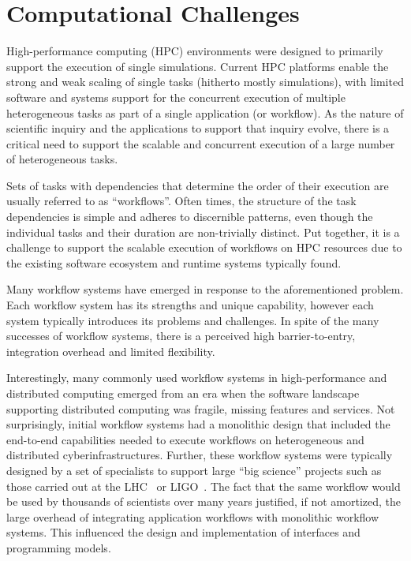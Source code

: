 \documentclass[conference]{IEEEtran}
\begin{document}
\section{Computational Challenges}\label{sec:cc}

High-performance computing (HPC) environments were designed to primarily
support the execution of single simulations. Current HPC platforms enable the
strong and weak scaling of single tasks (hitherto mostly simulations), with
limited software and systems support for the concurrent execution of multiple
heterogeneous tasks as part of a single application (or workflow). As the
nature of scientific inquiry and the applications to support that inquiry
evolve, there is a critical need to support the scalable and concurrent
execution of a large number of heterogeneous tasks.

Sets of tasks with dependencies that determine the order of their execution
are usually referred to as ``workflows''. Often times, the structure of the
task dependencies is simple and adheres to discernible patterns, even though
the individual tasks and their duration are non-trivially distinct. Put
together, it is a challenge to support the scalable execution of workflows on
HPC resources due to the existing software ecosystem and runtime systems
typically found.

Many workflow systems have emerged in response to the aforementioned problem.
Each workflow system has its strengths and unique capability, however each
system typically introduces its problems and challenges. In spite of the many
successes of workflow systems, there is a perceived high barrier-to-entry,
integration overhead and limited flexibility.

Interestingly, many commonly used workflow systems in high-performance and
distributed computing emerged from an era when the software landscape
supporting distributed computing was fragile, missing features and services.
Not surprisingly, initial workflow systems had a monolithic design that
included the end-to-end capabilities needed to execute workflows on
heterogeneous and distributed cyberinfrastructures. Further, these workflow
systems were typically designed by a set of specialists to support large
``big science'' projects such as those carried out at the
LHC~\cite{breskin2009cern} or LIGO~\cite{althouse1992ligo}. The fact that the
same workflow would be used by thousands of scientists over many years
justified, if not amortized, the large overhead of integrating application
workflows with monolithic workflow systems. This influenced the design and
implementation of interfaces and programming models.
\end{document}
